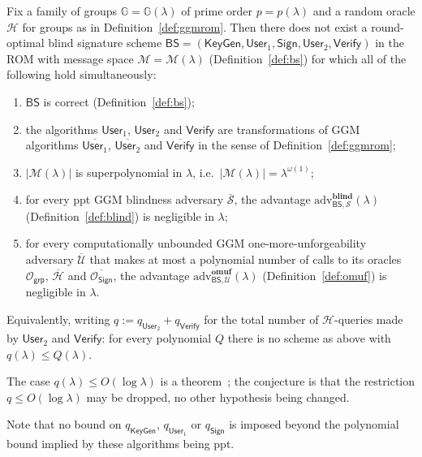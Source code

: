 \documentclass{conjura-conjecture}
\newcommand{\GG}{\mathbb{G}}
\newcommand{\MM}{\mathcal{M}}
\newcommand{\HH}{\mathcal{H}}
\newcommand{\BS}{\mathsf{BS}}
\newcommand{\KeyGen}{\mathsf{KeyGen}}
\newcommand{\Userone}{\mathsf{User}_1}
\newcommand{\Usertwo}{\mathsf{User}_2}
\newcommand{\Sig}{\mathsf{Sign}}
\newcommand{\Ver}{\mathsf{Verify}}
\newcommand{\Ogrp}{\mathcal{O}_{\mathsf{grp}}}
\newcommand{\OSign}{\mathcal{O}_{\mathsf{Sign}}}
\newcommand{\adv}{\mathrm{adv}}
\begin{document}
\begin{conjecture}
\label{conj:main}
Fix a family of groups $\GG=\GG(\lambda)$ of prime order $p=p(\lambda)$
and a random oracle $\HH$ for groups as in
Definition~\ref{def:ggmrom}. Then there does not exist a round-optimal
blind signature scheme $\BS=(\KeyGen,\Userone,\Sig,\Usertwo,\Ver)$ in
the ROM with message space $\MM=\MM(\lambda)$
(Definition~\ref{def:bs}) for which all of the following hold
simultaneously:
\begin{enumerate}
  \item $\BS$ is correct (Definition~\ref{def:bs});
  \item the algorithms $\Userone$, $\Usertwo$ and $\Ver$ are
    transformations of GGM algorithms $\overline{\Userone}$,
    $\overline{\Usertwo}$ and $\overline{\Ver}$ in the sense of
    Definition~\ref{def:ggmrom};
  \item $|\MM(\lambda)|$ is superpolynomial in $\lambda$, i.e.\
    $|\MM(\lambda)|=\lambda^{\omega(1)}$;
  \item for every ppt GGM blindness adversary $\overline{\mathcal{S}}$,
    the advantage $\adv^{\mathbf{blind}}_{\BS,\mathcal{S}}(\lambda)$
    (Definition~\ref{def:blind}) is negligible in $\lambda$;
  \item for every computationally unbounded GGM
    one-more-unforgeability adversary $\overline{\mathcal{U}}$ that
    makes at most a polynomial number of calls to its oracles $\Ogrp$,
    $\overline{\HH}$ and $\overline{\OSign}$, the advantage
    $\adv^{\mathbf{omuf}}_{\BS,\mathcal{U}}(\lambda)$
    (Definition~\ref{def:omuf}) is negligible in $\lambda$.
\end{enumerate}
Equivalently, writing $q:=q_{\Usertwo}+q_{\Ver}$ for the total number of
$\HH$-queries made by $\Usertwo$ and $\Ver$: for every polynomial $Q$
there is no scheme as above with $q(\lambda)\le Q(\lambda)$.
\end{conjecture}

\begin{remark}\label{rem:known}
The case $q(\lambda)\le O(\log\lambda)$ is a theorem~\cite{DKT26}; the
conjecture is that the restriction $q \le O(\log \lambda)$ may be
dropped, no other hypothesis being changed.
\end{remark}

\begin{remark}
\label{rem:unbounded}
Note that no bound on $q_{\KeyGen}$, $q_{\Userone}$ or $q_{\Sig}$ is
imposed beyond the polynomial bound implied by these algorithms being
ppt.
\end{remark}
\end{document}
